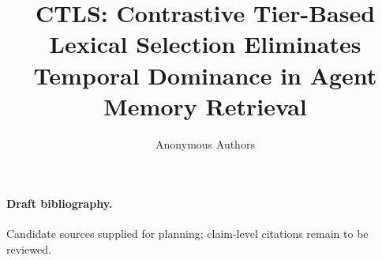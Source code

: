 \documentclass{article}
\title{CTLS: Contrastive Tier-Based Lexical Selection Eliminates Temporal Dominance in Agent Memory Retrieval}
\author{Anonymous Authors}
\begin{document}
\maketitle
\begin{abstract}

\end{abstract}









\paragraph{Draft bibliography.} Candidate sources supplied for planning; claim-level citations remain to be reviewed.
\nocite{*}


\end{document}
